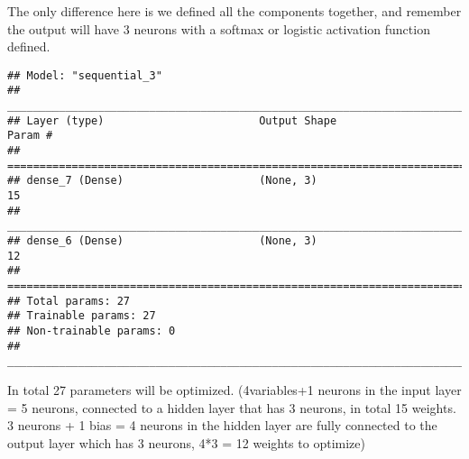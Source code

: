 \documentclass[
]{book}
\newenvironment{Shaded}{\begin{snugshade}}{\end{snugshade}}
\newcommand{\DataTypeTok}[1]{\textcolor[rgb]{0.13,0.29,0.53}{#1}}
\newcommand{\DecValTok}[1]{\textcolor[rgb]{0.00,0.00,0.81}{#1}}
\newcommand{\KeywordTok}[1]{\textcolor[rgb]{0.13,0.29,0.53}{\textbf{#1}}}
\newcommand{\NormalTok}[1]{#1}
\newcommand{\OperatorTok}[1]{\textcolor[rgb]{0.81,0.36,0.00}{\textbf{#1}}}
\newcommand{\StringTok}[1]{\textcolor[rgb]{0.31,0.60,0.02}{#1}}
\begin{document}
The only difference here is we defined all the components together, and remember the output will have 3 neurons with a softmax or logistic activation function defined.

\begin{Shaded}
\end{Shaded}

\begin{verbatim}
## Model: "sequential_3"
## ________________________________________________________________________________
## Layer (type)                        Output Shape                    Param #     
## ================================================================================
## dense_7 (Dense)                     (None, 3)                       15          
## ________________________________________________________________________________
## dense_6 (Dense)                     (None, 3)                       12          
## ================================================================================
## Total params: 27
## Trainable params: 27
## Non-trainable params: 0
## ________________________________________________________________________________
\end{verbatim}

In total 27 parameters will be optimized. (4variables+1 neurons in the input layer = 5 neurons, connected to a hidden layer that has 3 neurons, in total 15 weights. 3 neurons + 1 bias = 4 neurons in the hidden layer are fully connected to the output layer which has 3 neurons, 4*3 = 12 weights to optimize)
\end{document}
